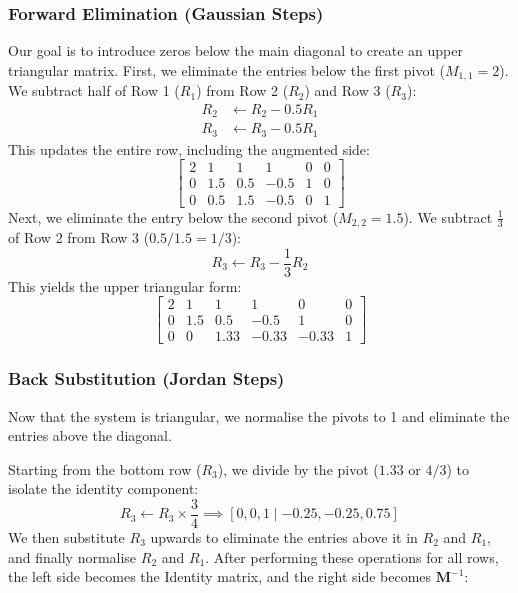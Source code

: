 \documentclass[a4paper,11pt]{article}
\begin{document}
\subsubsection{Forward Elimination (Gaussian Steps)}
Our goal is to introduce zeros below the main diagonal to create an upper triangular matrix.
First, we eliminate the entries below the first pivot ($M_{1,1}=2$). We subtract half of Row 1 ($R_1$) from Row 2 ($R_2$) and Row 3 ($R_3$):
\begin{align*}
    R_2 &\leftarrow R_2 - 0.5 R_1 \\
    R_3 &\leftarrow R_3 - 0.5 R_1
\end{align*}
This updates the entire row, including the augmented side:
\begin{equation}
    \left[
    \begin{array}{ccc|ccc}
    2 & 1 & 1 & 1 & 0 & 0 \\
    0 & 1.5 & 0.5 & -0.5 & 1 & 0 \\
    0 & 0.5 & 1.5 & -0.5 & 0 & 1
    \end{array}
    \right]
\end{equation}
Next, we eliminate the entry below the second pivot ($M_{2,2}=1.5$). We subtract $\frac{1}{3}$ of Row 2 from Row 3 ($0.5 / 1.5 = 1/3$):
\begin{equation*}
    R_3 \leftarrow R_3 - \frac{1}{3} R_2
\end{equation*}
This yields the upper triangular form:
\begin{equation}
    \left[
    \begin{array}{ccc|ccc}
    2 & 1 & 1 & 1 & 0 & 0 \\
    0 & 1.5 & 0.5 & -0.5 & 1 & 0 \\
    0 & 0 & 1.33 & -0.33 & -0.33 & 1
    \end{array}
    \right]
\end{equation}

\subsubsection{Back Substitution (Jordan Steps)}
Now that the system is triangular, we normalise the pivots to 1 and eliminate the entries above the diagonal.

Starting from the bottom row ($R_3$), we divide by the pivot ($1.33$ or $4/3$) to isolate the identity component:
\begin{equation}
    R_3 \leftarrow R_3 \times \frac{3}{4} \implies [0, 0, 1 \mid -0.25, -0.25, 0.75]
\end{equation}
We then substitute $R_3$ upwards to eliminate the entries above it in $R_2$ and $R_1$, and finally normalise $R_2$ and $R_1$. After performing these operations for all rows, the left side becomes the Identity matrix, and the right side becomes $\mathbf{M}^{-1}$:
\end{document}
